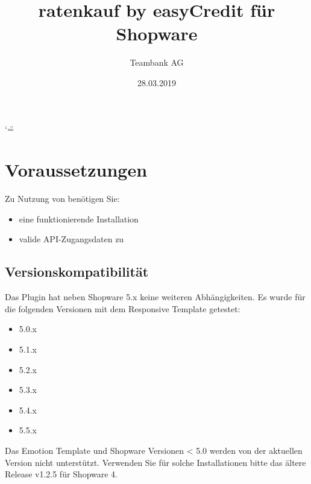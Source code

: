 \documentclass[a4paper,10pt,openany,oneside,ngerman]{sphinxmanual}
\title{ratenkauf by easyCredit für Shopware}
\date{28.03.2019}
\author{Teambank AG}
\begin{document}
\ifnum\catcode`\"=\active{}\fi
\maketitle
\sphinxtableofcontents
{}\label{\detokenize{index::doc}}



\chapter{Voraussetzungen}
\label{\detokenize{requirements:ratenkauf-by-easycredit-fur-shopware-5-x}}\label{\detokenize{requirements::doc}}\label{\detokenize{requirements:voraussetzungen}}
Zu Nutzung von  benötigen Sie:
\begin{itemize}
\item {} 
eine funktionierende  Installation

\item {} 
valide API-Zugangsdaten zu 

\end{itemize}


\section{Versionskompatibilität}
\label{\detokenize{requirements:versionskompatibilitat}}
Das Plugin hat neben Shopware 5.x keine weiteren Abhängigkeiten. Es wurde für die folgenden Versionen mit dem Responsive Template getestet:
\begin{itemize}
\item {} 
5.0.x

\item {} 
5.1.x

\item {} 
5.2.x

\item {} 
5.3.x

\item {} 
5.4.x

\item {} 
5.5.x

\end{itemize}

Das Emotion Template und Shopware Versionen \textless{} 5.0 werden von der aktuellen Version nicht unterstützt.
Verwenden Sie für solche Installationen bitte das ältere Release v1.2.5 für Shopware 4.
\end{document}
